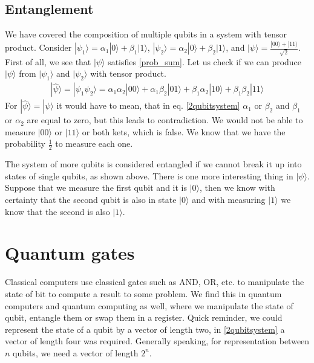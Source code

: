 \subsection{Entanglement}
We have covered the composition of multiple qubits in a system with tensor product. Consider $|\psi_1\rangle = \alpha_1 |0\rangle +\beta_1 |1\rangle$, $ |\psi_2\rangle = \alpha_2 |0\rangle +\beta_2 |1\rangle$, and $|\psi \rangle = \frac{|00 \rangle + |11 \rangle }{\sqrt{2}} $. First of all, we see that $| \psi \rangle$ satisfies \ref{prob_sum}. Let us check if we can produce $| \psi \rangle$ from $| \psi_1 \rangle$ and $| \psi_2 \rangle$ with tensor product.
\begin{equation} \label{2qubitsystem}
  \begin{aligned}
    |\widehat{\psi}\rangle = |\psi_1 \psi_2 \rangle = 
    \alpha_1 \alpha_2 |00\rangle +
    \alpha_1 \beta_2 |01\rangle +
    \beta_1 \alpha_2 |10\rangle +
    \beta_1 \beta_2 |11\rangle
    \end{aligned}
\end{equation}
For $|\widehat{\psi}\rangle = |\psi\rangle$ it would have to mean, that in eq. \ref{2qubitsystem} $\alpha_1$ or $\beta_2$ and $\beta_1$ or $\alpha_2$ are equal to zero, but this leads to contradiction. We would not be able to measure $|00\rangle$ or $|11\rangle$ or both kets, which is false. We know that we have the probability $\frac{1}{2}$ to measure each one. 

The system of more qubits is considered entangled if we cannot break it up into states of single qubits, as shown above. There is one more interesting thing in $| \psi \rangle$. Suppose that we measure the first qubit and it is $|0\rangle$, then we know with certainty that the second qubit is also in state $|0\rangle$ and with measuring $|1\rangle$ we know that the second is also $|1\rangle$. 

\section{Quantum gates}

Classical computers use classical gates such as AND, OR, etc. to manipulate the state of bit to compute a result to some problem. We find this in quantum computers and quantum computing as well, where we manipulate the state of qubit, entangle them or swap them in a register. 
Quick reminder, we could represent the state of a qubit by a vector of length two, in \ref{2qubitsystem} a vector of length four was required. Generally speaking, for representation between $n$ qubits, we need a vector of length $2^n$.


